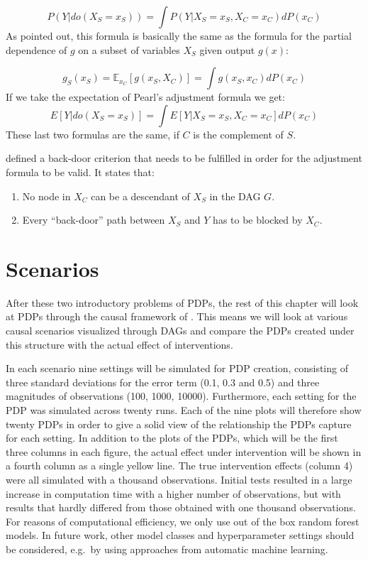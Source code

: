 \documentclass[]{krantz}
\begin{document}
\[P(Y|do(X_S = x_S)) = \int P(Y |X_S = x_S, X_C = x_C) dP(x_C)\] As
\citep{zhaohastie} pointed out, this formula is basically the same as
the formula for the partial dependence of \(g\) on a subset of variables
\(X_S\) given output \(g(x)\):

\[ g_S(x_S) = \mathbb E_{x_C}[g(x_S, X_C)] = \int g(x_S, x_C)dP(x_C)  \]
If we take the expectation of Pearl's adjustment formula we get:
\[ E[Y |do(X_S = x_S)] = \int E[Y |X_S = x_S, X_C = x_C] dP(x_C) \]
These last two formulas are the same, if \(C\) is the complement of
\(S\).

\citep{pearl1993} defined a back-door criterion that needs to be
fulfilled in order for the adjustment formula to be valid. It states
that:

\begin{enumerate}
\def\labelenumi{\arabic{enumi}.}
\item
  No node in \(X_C\) can be a descendant of \(X_S\) in the DAG \(G\).
\item
  Every ``back-door'' path between \(X_S\) and \(Y\) has to be blocked
  by \(X_C\).
\end{enumerate}

\section{Scenarios}\label{scenarios}

After these two introductory problems of PDPs, the rest of this chapter
will look at PDPs through the causal framework of \citep{pearl1993}.
This means we will look at various causal scenarios visualized through
DAGs and compare the PDPs created under this structure with the actual
effect of interventions.

In each scenario nine settings will be simulated for PDP creation,
consisting of three standard deviations for the error term (0.1, 0.3 and
0.5) and three magnitudes of observations (100, 1000, 10000).
Furthermore, each setting for the PDP was simulated across twenty runs.
Each of the nine plots will therefore show twenty PDPs in order to give
a solid view of the relationship the PDPs capture for each setting. In
addition to the plots of the PDPs, which will be the first three columns
in each figure, the actual effect under intervention will be shown in a
fourth column as a single yellow line. The true intervention effects
(column 4) were all simulated with a thousand observations. Initial
tests resulted in a large increase in computation time with a higher
number of observations, but with results that hardly differed from those
obtained with one thousand observations. For reasons of computational
efficiency, we only use out of the box random forest models. In future
work, other model classes and hyperparameter settings should be
considered, e.g.~by using approaches from automatic machine learning.
\end{document}
